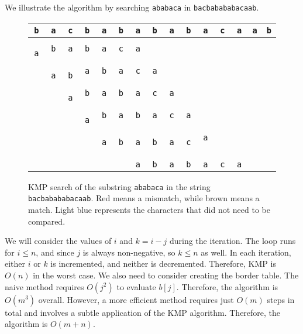 \documentclass[a4paper, openany]{memoir}
\begin{document}
We illustrate the algorithm by searching \texttt{ababaca} in \texttt{bacbabababacaab}. 
\begin{figure}[H]
    \centering
    \begin{tabular}{ccccccccccccccc}
        \texttt{b} & \texttt{a} & \texttt{c} & \texttt{b} & \texttt{a} & \texttt{b} & \texttt{a} & \texttt{b} & \texttt{a} & \texttt{b} & \texttt{a} & \texttt{c} & \texttt{a} & \texttt{a} & \texttt{b} \\
        \hline
        \texttt{\color{red} a} & \texttt{b} & \texttt{a} & \texttt{b} & \texttt{a} & \texttt{c} & \texttt{a} \\
        & \texttt{\color{brown} a} & \texttt{\color{red} b} & \texttt{a} & \texttt{b} & \texttt{a} & \texttt{c} & \texttt{a} \\
        & & \texttt{\color{red} a} & \texttt{b} & \texttt{a} & \texttt{b} & \texttt{a} & \texttt{c} & \texttt{a} \\
        & & & \texttt{\color{red} a} & \texttt{b} & \texttt{a} & \texttt{b} & \texttt{a} & \texttt{c} & \texttt{a} \\
        & & & & \texttt{\color{brown} a} & \texttt{\color{brown} b} & \texttt{\color{brown} a} & \texttt{\color{brown} b} & \texttt{\color{brown} a} & \texttt{\color{red} c} & \texttt{a} \\
        & & & & & & \texttt{\color{cyan} a} & \texttt{\color{cyan} b} & \texttt{\color{cyan} a} & \texttt{\color{brown} b} & \texttt{\color{brown} a} & \texttt{\color{brown} c} & \texttt{\color{brown} a}
    \end{tabular}
    \caption{KMP search of the substring \texttt{ababaca} in the string \texttt{bacbabababacaab}. Red means a mismatch, while brown means a match. Light blue represents the characters that did not need to be compared.}
\end{figure}

We will consider the values of $i$ and $k=i-j$ during the iteration. The loop runs for $i \leq n$, and since $j$ is always non-negative, so $k \leq n$ as well. In each iteration, either $i$ or $k$ is incremented, and neither is decremented. Therefore, KMP is $O(n)$ in the worst case. We also need to consider creating the border table. The naive method requires $O(j^2)$ to evaluate $b[j]$. Therefore, the algorithm is $O(m^3)$ overall. However, a more efficient method requires just $O(m)$ steps in total and involves a subtle application of the KMP algorithm. Therefore, the algorithm is $O(m+n)$.
\end{document}
